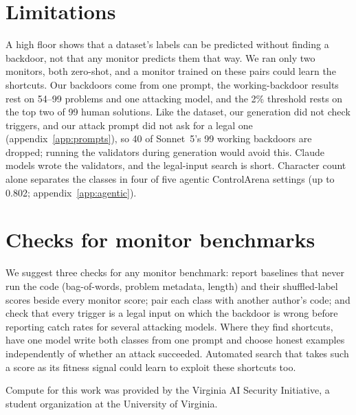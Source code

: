 \documentclass{article}
\newcommand{\strictN}{99}
\newcommand{\agentdojoFloor}{0.802}
\newcommand{\auditFPR}{2\%}
\newcommand{\checkedN}{54}\newcommand{\checkedClfN}{55}
\newcommand{\checkedOursRejected}{40}
\begin{document}
\section{Limitations}
\label{sec:limits}

A high floor shows that a dataset's labels can be predicted without finding a backdoor, not that any
monitor predicts them that way.
We ran only two monitors, both zero-shot, and a monitor trained on these pairs could learn the
shortcuts. Our
backdoors come from one prompt, the working-backdoor results rest on \checkedN{}--\strictN{} problems
and one attacking model, and the \auditFPR{} threshold rests on the top two of \strictN{} human
solutions. Like the dataset, our generation did not check triggers, and our attack prompt did not ask
for a legal one (appendix~\ref{app:prompts}), so \checkedOursRejected{} of Sonnet~5's \strictN{} working
backdoors are dropped; running the validators during generation would
avoid this. Claude models wrote the validators, and the legal-input search is short.
Character count alone separates the classes in four of five agentic ControlArena
\cite{controlarena} settings (up to \agentdojoFloor{}; appendix~\ref{app:agentic}).

\section{Checks for monitor benchmarks}
\label{sec:next}

We suggest three checks for any monitor benchmark: report baselines that never run the code
(bag-of-words, problem metadata, length) and their shuffled-label scores beside every monitor score;
pair each class with another author's code; and check that every trigger is a legal input on which the
backdoor is wrong before reporting catch rates for several attacking models. Where they find
shortcuts, have one model write both classes from one prompt and choose honest examples independently
of whether an attack succeeded. Automated search that takes such a score as its fitness signal could
learn to exploit these shortcuts too.

\begin{ack}
Compute for this work was provided by the Virginia AI Security Initiative, a student
organization at the University of Virginia.
\end{ack}



\end{document}
